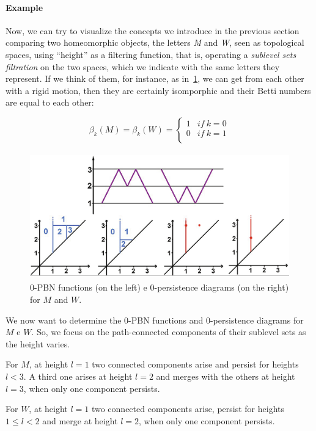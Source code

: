 \documentclass[english, LaM, oneside, noexaminfo]{sapthesis}
\begin{document}
\paragraph{Example}
\label{example}

Now, we can try to visualize the concepts we introduce in the previous section comparing two homeomorphic objects, the letters \textit{M} and \textit{W}, seen as topological spaces, using “height” as a filtering function, that is, operating a \textit{sublevel sets filtration} on the two spaces, which we indicate with the same letters they represent. If we think of them, for instance, as in~\cref{fig:M_W}, we can get from each other with a rigid motion, then they are certainly isomporphic and their Betti numbers are equal to each other:

$$\beta_k(M) =\beta_k(W) = \left \{
\begin{array}{lr}
1 & if \ k=0 \\
0 & if \ k=1 \\
\end{array}\right.$$ 

\begin{figure}[tb]
\centering
\includegraphics[height=5.5cm]{M_W 0-PBN 0-PDs.png}
\caption{$0$-PBN functions (on the left) e $0$-persistence diagrams (on the right) for $M$ and $W$.}\label{fig:M_W}
\end{figure}

\noindent We now want to determine the $0$-PBN functions and $0$-persistence diagrams for $M$ e $W$. So, we focus on the path-connected components of their sublevel sets as the height varies. 

\noindent For $M$, at height $l = 1$ two connected components arise and persist for heights $l<3$. A third one arises at height $l=2$ and merges with the others at height $l=3$, when only one component persists.

\noindent For $W$, at height $l = 1$ two connected components arise, persist for heights $1 \leq l <2$ and merge at height $l=2$, when only one component persists.
\end{document}
